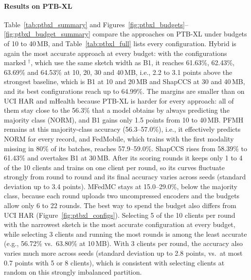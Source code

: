 \documentclass[sigconf]{acmart}
\newcommand{\method}{Hybrid}   %
\begin{document}
\paragraph{Results on PTB-XL}
Table~\ref{tab:ptbxl_summary} and Figures~\ref{fig:ptbxl_budgets}--\ref{fig:ptbxl_budget_summary}
compare the approaches on PTB-XL under budgets of 10 to 40\,MB, and
Table~\ref{tab:ptbxl_full} lists every configuration. \method{} is again the
most accurate approach at every budget: with the configurations marked
$^\dagger$, which use the same sketch width as B1, it reaches 61.63\%, 62.43\%,
63.69\% and 64.53\% at 10, 20, 30 and 40\,MB, i.e., 2.2 to 3.1 points above the
strongest baseline, which is B1 at 10 and 20\,MB and ShapCCS at 30 and
40\,MB, and its best configurations reach up to 64.99\%. The
margins are smaller than on UCI HAR and mHealth because PTB-XL is harder for
every approach: all of them stay close to the 56.3\% that a model obtains by
always predicting the majority class (NORM), and B1 gains only 1.5 points from
10 to 40\,MB. PFMH remains at this majority-class accuracy (56.3--57.0\%), i.e.,
it effectively predicts NORM for every record, and FedMobile, which trains with
the first modality missing in 80\% of its batches, reaches 57.9--59.0\%.
ShapCCS rises from 58.39\% to 61.43\% and overtakes B1 at 30\,MB. After its
scoring rounds it keeps only 1 to 4 of the 10 clients and trains on one client
per round, so its curves fluctuate strongly from round to round and its final
accuracy varies across seeds (standard deviation up to 3.4 points). MFedMC
stays at 15.0--29.0\%, below the majority class, because each round uploads two
uncompressed encoders and the budgets allow only 6 to 22 rounds. The best way to
spend the budget also differs from UCI HAR (Figure~\ref{fig:ptbxl_configs}). Selecting 5 of the 10 clients per
round with the narrowest sketch is the most accurate configuration at every
budget, while selecting 3 clients and running the most rounds is among the least
accurate (e.g., 56.72\% vs.\ 63.80\% at 10\,MB). With 3 clients per round, the
accuracy also varies much more across seeds (standard deviation up to 2.8 points,
vs.\ at most 0.7 points with 5 or 8 clients), which is consistent with selecting
clients at random on this strongly imbalanced partition.
\end{document}
